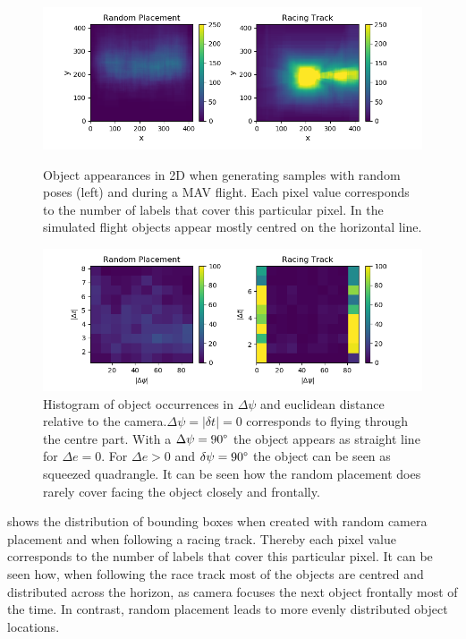 \begin{figure}
	\begin{minipage}{\textwidth}
		\includegraphics[width=\textwidth]{fig/heatmap_camplace}
		\caption{Object appearances in 2D when generating samples with random poses (left) and during a \ac{MAV} flight. Each pixel value corresponds to the number of labels that cover this particular pixel. In the simulated flight objects appear mostly centred on the horizontal line.}
		\label{fig:heatmap_camplace}
	\end{minipage}
	\begin{minipage}{\textwidth}
		\includegraphics[width=\textwidth]{fig/hist2d_camplace}
		\caption{Histogram of object occurrences in $\Delta \psi$ and euclidean distance relative to the camera.$\Delta \psi = |\delta t| = 0$ corresponds to flying through the centre part. With a $\Delta \psi = 90\degree$ the object appears as straight line for $\Delta e = 0$. For $\Delta e > 0$ and $\delta \psi = 90\degree$ the object can be seen as squeezed quadrangle. It can be seen how the random placement does rarely cover facing the object closely and frontally. }
		\label{fig:hist2d_camplace}
	\end{minipage}
\end{figure}

 shows the distribution of bounding boxes when created with random camera placement and when following a racing track. Thereby each pixel value corresponds to the number of labels that cover this particular pixel. It can be seen how, when following the race track most of the objects are centred and distributed across the horizon, as camera focuses the next object frontally most of the time. In contrast, random placement leads to more evenly distributed object locations. 

